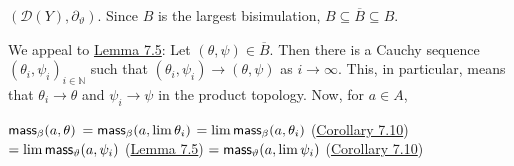 \hypertarget{html:S7.SS0.SSS0.P0.SPx7.p1.m4}{}\({({\mathcal{D}}(Y),\partial_{\vartheta})}\). Since %
\hypertarget{html:S7.SS0.SSS0.P0.SPx7.p1.m5}{}\({B}\) is the largest bisimulation, %
\hypertarget{html:S7.SS0.SSS0.P0.SPx7.p1.m6}{}\({B\subseteq\overline{B}\subseteq B}\).
\par\medskip
\hypertarget{html:S7.SS0.SSS0.P0.SPx7.p2}{} We appeal to \hyperlink{html:S7.Thmtheorem5}{Lemma 7.5}: Let %
\hypertarget{html:S7.SS0.SSS0.P0.SPx7.p2.m1}{}\({(\theta,\psi)\in\overline{B}}\). Then there is a Cauchy sequence %
\hypertarget{html:S7.SS0.SSS0.P0.SPx7.p2.m2}{}\({(\theta_{i},\psi_{i})_{i\in\mathbb{N}}}\) such that %
\hypertarget{html:S7.SS0.SSS0.P0.SPx7.p2.m3}{}\({(\theta_{i},\psi_{i})\to(\theta,\psi)}\) as %
\hypertarget{html:S7.SS0.SSS0.P0.SPx7.p2.m4}{}\({i\to\infty}\). This, in particular, means that %
\hypertarget{html:S7.SS0.SSS0.P0.SPx7.p2.m5}{}\({\theta_{i}\to\theta}\) and %
\hypertarget{html:S7.SS0.SSS0.P0.SPx7.p2.m6}{}\({\psi_{i}\to\psi}\) in the product topology. Now, for %
\hypertarget{html:S7.SS0.SSS0.P0.SPx7.p2.m7}{}\({a\in A}\),
\par\medskip
\hypertarget{html:S8.EGx10}{} %
\hypertarget{html:S7.Ex7}{}  %
\hypertarget{html:S7.Ex7.m1}{}\({\displaystyle\mbox{\sf mass}_{\beta}(a,\theta)}\) %
\hypertarget{html:S7.Ex7.m2}{}\({\displaystyle=\mbox{\sf mass}_{\beta}(a,\lim\theta_{i})}\)   %
\hypertarget{html:S7.Ex8}{}   %
\hypertarget{html:S7.Ex8.m1}{}\({\displaystyle=\lim\mbox{\sf mass}_{\beta}(a,\theta_{i})}\)  (\hyperlink{html:S7.Thmtheorem10}{Corollary 7.10})  %
\hypertarget{html:S7.Ex9}{}   %
\hypertarget{html:S7.Ex9.m1}{}\({\displaystyle=\lim\mbox{\sf mass}_{\vartheta}(a,\psi_{i})}\)  (\hyperlink{html:S7.Thmtheorem5}{Lemma 7.5})  %
\hypertarget{html:S7.Ex10}{}   %
\hypertarget{html:S7.Ex10.m1}{}\({\displaystyle=\mbox{\sf mass}_{\vartheta}(a,\lim\psi_{i})}\)  (\hyperlink{html:S7.Thmtheorem10}{Corollary 7.10})  %
